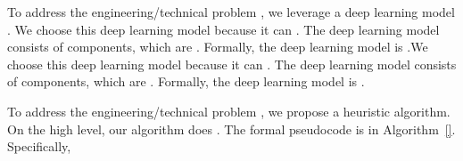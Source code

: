 To address the engineering/technical problem \blank{}, we leverage a deep learning model \blank{}. We choose this deep learning model \blank{} because it can \blank{}. The deep learning model consists of \blank{} components, which are \blank{}. Formally, the deep learning model is .We choose this deep learning model \blank{} because it can \blank{}. The deep learning model consists of \blank{} components, which are \blank{}. Formally, the deep learning model is .



To address the engineering/technical problem \blank{}, we propose a heuristic algorithm. On the high level, our algorithm does \blank{}. The formal pseudocode is in Algorithm~\ref{}. Specifically, 

